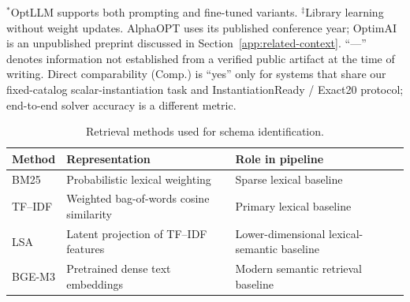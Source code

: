 \documentclass[pdflatex,sn-basic,Numbered]{sn-jnl}
\begin{document}
\begin{table}[htbp]
\vspace{1mm}
\raggedright
\small
$^{*}$OptLLM supports both prompting and fine-tuned variants.
$^{\ddagger}$Library learning without weight updates.
AlphaOPT uses its published conference year; OptimAI is an unpublished preprint discussed in Section~\ref{app:related-context}.
``---'' denotes information not established from a verified public artifact at the time of writing.
Direct comparability (Comp.) is ``yes'' only for systems that share our fixed-catalog scalar-instantiation
task and InstantiationReady / Exact20 protocol; end-to-end solver accuracy is a different metric.
\end{table}
\begin{table}[htbp]
\centering
\caption{Retrieval methods used for schema identification.}
\label{tab:retrieval_backbones}
\small
\begin{tabularx}{\linewidth}{@{}lXX@{}}
\toprule
Method & Representation & Role in pipeline \\
\midrule
BM25 & Probabilistic lexical weighting & Sparse lexical baseline \\
TF--IDF & Weighted bag-of-words cosine similarity & Primary lexical baseline \\
LSA & Latent projection of TF--IDF features & Lower-dimensional lexical-semantic baseline \\
BGE-M3 & Pretrained dense text embeddings & Modern semantic retrieval baseline \\
\bottomrule
\end{tabularx}
\end{table}
\end{document}
